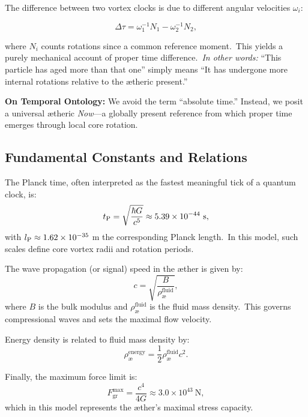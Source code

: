 The difference between two vortex clocks is due to different angular velocities $\omega_i$:

\[
\Delta \tau = \omega_1^{-1} N_1 - \omega_2^{-1} N_2,
\]

where $N_i$ counts rotations since a common reference moment.\ This yields a purely mechanical account of proper time difference.\ \textit{In other words:} “This particle has aged more than that one” simply means “It has undergone more internal rotations relative to the ætheric present.”

\begin{remark}
\textbf{On Temporal Ontology:} We avoid the term “absolute time.” Instead, we posit a universal ætheric \emph{Now}—a globally present reference from which proper time emerges through local core rotation.
\end{remark}


\subsection*{Fundamental Constants and Relations}
The Planck time, often interpreted as the fastest meaningful tick of a quantum clock, is:
\[
    t_{\textrm P} = \sqrt{\frac{\hbar G}{c^5}} \approx 5.39\times10^{-44}\ \text{s},
\]
with $l_{\textrm P} \approx 1.62\times10^{-35}$ m the corresponding Planck length.\ In this model, such scales define core vortex radii and rotation periods.

The wave propagation (or signal) speed in the æther is given by:
\[
    c = \sqrt{\frac{B}{\rho^{\text{fluid}}_{\text{\ae}}}},
\]
where $B$ is the bulk modulus and $\rho^{\text{fluid}}_{\text{\ae}}$ is the fluid mass density.\ This governs compressional waves and sets the maximal flow velocity.

Energy density is related to fluid mass density by:
\[
    \rho^{\text{energy}}_{\text{\ae}} = \frac{1}{2} \rho^{\text{fluid}}_{\text{\ae}} c^2.
\]

Finally, the maximum force limit is:
\[
    F^{\text{max}}_{\text{gr}} = \frac{c^4}{4G} \approx 3.0 \times 10^{43}\ \text{N},
\]
which in this model represents the æther’s maximal stress capacity.